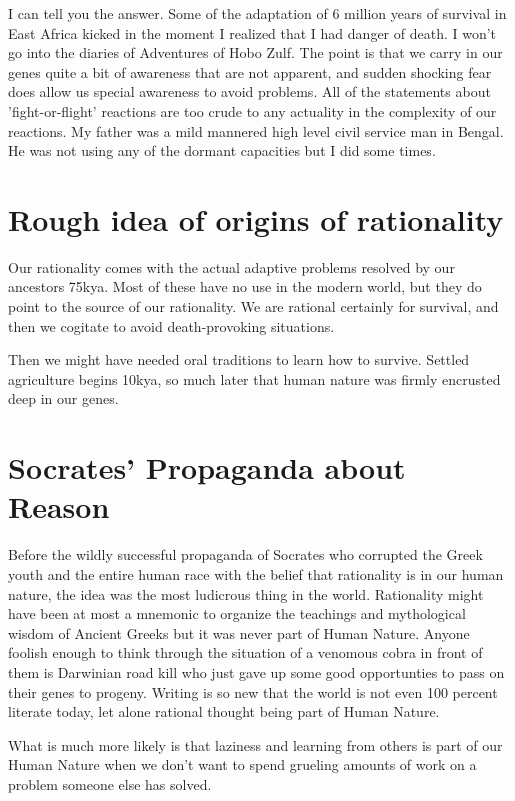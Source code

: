 \documentclass{amsart}
\begin{document}
I can tell you the answer.  Some of the adaptation of 6 million years of survival in East Africa kicked in the moment I realized that I had danger of death.  I won't go into the diaries of Adventures of Hobo Zulf.  The point is that we carry in our genes quite a bit of awareness that are not apparent, and sudden shocking fear does allow us special awareness to avoid problems.  All of the statements about 'fight-or-flight' reactions are too crude to any actuality in the complexity of our reactions.  My father was a mild mannered high level civil service man in Bengal.  He was not using any of the dormant capacities but I did some times. 

\section{Rough idea of origins of rationality}

Our rationality comes with the actual adaptive problems resolved by our ancestors 75kya.  Most of these have no use in the modern world, but they do point to the source of our rationality.  We are rational certainly for survival, and then we cogitate to avoid death-provoking situations.  

Then we might have needed oral traditions to learn how to survive.  Settled agriculture begins 10kya, so much later that human nature was firmly encrusted deep in our genes. 

\section{Socrates' Propaganda about Reason}

Before the wildly successful propaganda of Socrates who corrupted the Greek youth and the entire human race with the belief that rationality is in our human nature, the idea was the most ludicrous thing in the world.  Rationality might have been at most a mnemonic to organize the teachings and mythological wisdom of Ancient Greeks but it was never part of Human Nature.  Anyone foolish enough to think through the situation of a venomous cobra in front of them is Darwinian road kill who just gave up some good opportunties to pass on their genes to progeny.  Writing is so new that the world is not even 100 percent literate today, let alone rational thought being part of Human Nature.

What is much more likely is that laziness and learning from others is part of our Human Nature when we don't want to spend grueling amounts of work on a problem someone else has solved.
\end{document}
